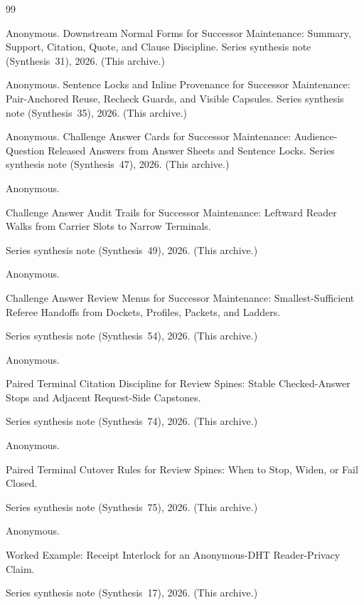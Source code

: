 \documentclass[11pt]{article}
\begin{document}
\begin{thebibliography}{99}\small

Anonymous.
\newblock Downstream Normal Forms for Successor Maintenance: Summary, Support, Citation, Quote, and Clause Discipline.
\newblock Series synthesis note (Synthesis~31), 2026. (This archive.)

Anonymous.
\newblock Sentence Locks and Inline Provenance for Successor Maintenance: Pair-Anchored Reuse, Recheck Guards, and Visible Capsules.
\newblock Series synthesis note (Synthesis~35), 2026. (This archive.)

Anonymous.
\newblock Challenge Answer Cards for Successor Maintenance: Audience-Question Released Answers from Answer Sheets and Sentence Locks.
\newblock Series synthesis note (Synthesis~47), 2026. (This archive.)

Anonymous.

\newblock Challenge Answer Audit Trails for Successor Maintenance: Leftward Reader Walks from Carrier Slots to Narrow Terminals.

\newblock Series synthesis note (Synthesis~49), 2026. (This archive.)

Anonymous.

\newblock Challenge Answer Review Menus for Successor Maintenance: Smallest-Sufficient Referee Handoffs from Dockets, Profiles, Packets, and Ladders.

\newblock Series synthesis note (Synthesis~54), 2026. (This archive.)

Anonymous.

\newblock Paired Terminal Citation Discipline for Review Spines: Stable Checked-Answer Stops and Adjacent Request-Side Capstones.

\newblock Series synthesis note (Synthesis~74), 2026. (This archive.)

Anonymous.

\newblock Paired Terminal Cutover Rules for Review Spines: When to Stop, Widen, or Fail Closed.

\newblock Series synthesis note (Synthesis~75), 2026. (This archive.)

Anonymous.

\newblock Worked Example: Receipt Interlock for an Anonymous-DHT Reader-Privacy Claim.

\newblock Series synthesis note (Synthesis~17), 2026. (This archive.)

\end{thebibliography}
\end{document}
